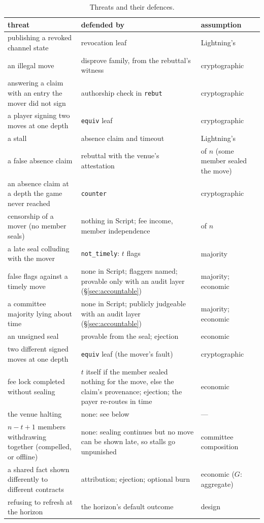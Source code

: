 \documentclass[11pt]{article}
\begin{document}
\begin{table}[H]
\centering
\small
\begin{tabular}{>{\raggedright\arraybackslash}p{44mm}>{\raggedright\arraybackslash}p{62mm}>{\raggedright\arraybackslash}p{30mm}}
\toprule
threat & defended by & assumption \\
\midrule
publishing a revoked channel state & revocation leaf & Lightning's \\
an illegal move & disprove family, from the rebuttal's witness & cryptographic \\
answering a claim with an entry the mover did not sign & authorship check in \texttt{rebut} & cryptographic \\
a player signing two moves at one depth & \texttt{equiv} leaf & cryptographic \\
a stall & absence claim and timeout & Lightning's \\
a false absence claim & rebuttal with the venue's attestation & 1 of $n$ (some member sealed the move) \\
an absence claim at a depth the game never reached & \texttt{counter} & cryptographic \\
censorship of a mover (no member seals) & nothing in Script; fee income, member independence & 1 of $n$ \\
a late seal colluding with the mover & \texttt{not\_timely}: $t$ flags & majority \\
false flags against a timely move & none in Script; flaggers named; provable only with an audit layer (\S\ref{sec:accountable}) & majority; economic \\
a committee majority lying about time & none in Script; publicly judgeable with an audit layer (\S\ref{sec:accountable}) & majority; economic \\
an unsigned seal & provable from the seal; ejection & economic \\
two different signed moves at one depth & \texttt{equiv} leaf (the mover's fault) & cryptographic \\
fee lock completed without sealing & $t$ itself if the member sealed nothing for the move, else the claim's provenance; ejection; the payer re-routes in time & economic \\
the venue halting & none: see below & --- \\
$n-t+1$ members withdrawing together (compelled, or offline) & none: sealing continues but no move can be shown late, so stalls go unpunished & committee composition \\
a shared fact shown differently to different contracts & attribution; ejection; optional burn & economic ($G$: aggregate) \\
refusing to refresh at the horizon & the horizon's default outcome & design \\
\bottomrule
\end{tabular}
\caption{Threats and their defences.}
\label{tab:security}
\end{table}
\end{document}
